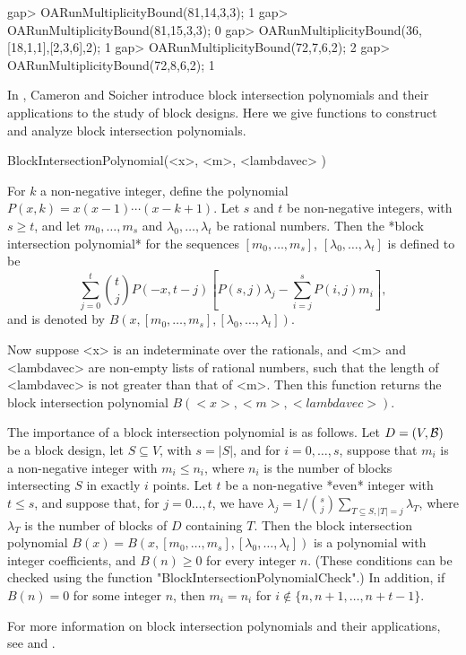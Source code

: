 \beginexample
gap> OARunMultiplicityBound(81,14,3,3);
1
gap> OARunMultiplicityBound(81,15,3,3);
0
gap> OARunMultiplicityBound(36,[18,1,1],[2,3,6],2);
1
gap> OARunMultiplicityBound(72,7,6,2);
2
gap> OARunMultiplicityBound(72,8,6,2);
1
\endexample



In \cite{CaSo}, Cameron and Soicher introduce block intersection
polynomials and their applications to the study of block designs.
Here we give functions to construct and analyze block intersection 
polynomials. 

\>BlockIntersectionPolynomial(<x>, <m>, <lambdavec> )

For $k$ a non-negative integer, define the polynomial
$P(x,k)=x(x-1)\cdots(x-k+1)$. Let $s$ and $t$ be non-negative
integers, with $s\ge t$, and let $m_0,\ldots,m_s$ and
$\lambda_0,\ldots,\lambda_t$ be rational numbers. Then the *block
intersection polynomial* for the sequences $[m_0,\ldots,m_s]$,
$[\lambda_0,\ldots,\lambda_t]$ is defined to be 
$$\sum_{j=0}^t{t\choose j}P(-x,t-j)[P(s,j)\lambda_j-\sum_{i=j}^s P(i,j)m_i],$$ 
and is denoted by $B(x,[m_0,\ldots,m_s],[\lambda_0,\ldots,\lambda_t]).$

Now suppose <x> is an indeterminate over the rationals, and <m> and
<lambdavec> are non-empty lists of rational numbers, such that the length
of <lambdavec> is not greater than that of <m>.  Then this function
returns the block intersection polynomial $B(<x>,<m>,<lambdavec>)$.

The importance of a block intersection polynomial is as follows.
Let $D=(V,{\cal B})$ be a block design, let $S\subseteq V$, with $s=|S|$,
and for $i=0,\ldots,s$, suppose that $m_i$ is a non-negative integer
with $m_i\le n_i$, where $n_i$ is the number of blocks intersecting $S$
in exactly $i$ points. Let $t$ be a non-negative *even* integer with $t\le
s$, and suppose that, for $j=0\ldots,t$, we have $\lambda_j=1/{s\choose
j}\sum_{T\subseteq S,|T|=j}\lambda_T$, where $\lambda_T$ is the
number of blocks of $D$ containing $T$.  Then the block intersection
polynomial $B(x)=B(x,[m_0,\ldots,m_s],[\lambda_0,\ldots,\lambda_t])$
is a polynomial with integer coefficients, and $B(n)\ge 0$ for every
integer $n$. (These conditions can be checked using the function
"BlockIntersectionPolynomialCheck".) In addition, if $B(n)=0$ for some
integer $n$, then $m_i=n_i$ for $i\not\in\{n,n+1,\ldots,n+t-1\}$.

For more information on block intersection polynomials and their
applications, see \cite{CaSo} and \cite{Soi1}.

